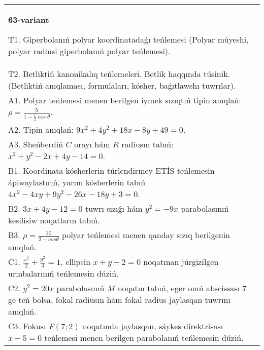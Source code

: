 \documentclass{article}
\begin{document}
\begin{tabular}{m{17cm}}
\textbf{63-variant}
\newline

T1. Giperbolanıń polyar koordinatadaǵı teńlemesi (Polyar múyeshi, polyar radiusi giperbolanıń polyar teńlemesi).\\

T2. Betliktiń kanonikalıq teńlemeleri. Betlik haqqında túsinik. (Betliktiń anıqlaması, formulaları, kósher, baǵıtlawshı tuwrılar).\\

A1. Polyar teńlemesi menen berilgen iymek sızıqtıń tipin anıqlań: $\rho=\frac{5}{1-\frac{1}{2}\cos\theta}$.\\

A2. Tipin anıqlań: $9 x^{2}+4 y^{2}+18 x-8 y+49=0$.\\

A3. Sheńberdiń $C$ orayı hám $R$ radiusın tabıń: $x^2+y^2-2 x+4 y-14=0$.\\

B1. Koordinata kósherlerin túrlendirmey ETİS teńlemesin ápiwaylastırıń, yarım kósherlerin tabıń $4x^{2} - 4xy + 9y^{2} - 26x - 18y + 3 = 0$.\\

B2. $3x + 4y - 12 = 0$ tuwrı sızıǵı hám $y^{2} = - 9x$ parabolasınıń kesilisiw noqatların tabıń.  \\

B3. $\rho = \frac{10}{2 - cos\theta}$ polyar teńlemesi menen qanday sızıq berilgenin anıqlań.  \\

C1. $\frac{x^{2}}{2} + \frac{y^{2}}{3} = 1$, ellipsin $x + y - 2 = 0$ noqatınan júrgizilgen urınbalarınıń teńlemesin dúziń.  \\

C2. $y^{2} = 20x$ parabolasınıń $M$ noqatın tabıń, eger onıń abscissası 7 ge teń bolsa, fokal radiusın hám fokal radius jaylasqan tuwrını anıqlań.\\

C3. Fokusı $F(7;2)$ noqatında jaylasqan, sáykes direktrisası $x - 5 = 0$ teńlemesi menen berilgen parabolanıń teńlemesin dúziń.  \\

\end{tabular}
\vspace{1cm}
\end{document}
